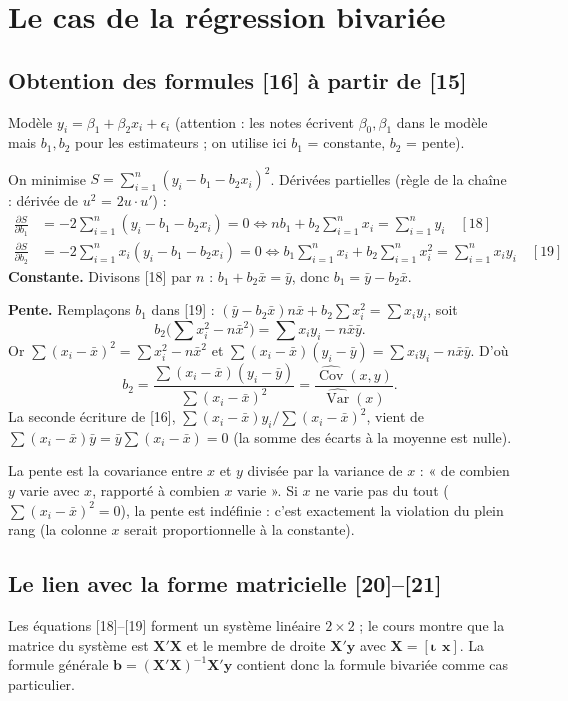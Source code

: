 \documentclass[11pt,a4paper]{article}
\newcommand{\vy}{\mathbf{y}}
\newcommand{\vX}{\mathbf{X}}
\newcommand{\vb}{\mathbf{b}}
\newcommand{\vx}{\mathbf{x}}
\newcommand{\vi}{\bm{\iota}}
\newcommand{\XtX}{\vX'\vX}
\newcommand{\XtXi}{(\vX'\vX)^{-1}}
\newcommand{\Var}{\operatorname{Var}}
\newcommand{\Cov}{\operatorname{Cov}}
\newcommand{\sumi}{\sum_{i=1}^{n}}
\begin{document}
\section{Le cas de la régression bivariée}

\subsection{Obtention des formules [16] à partir de [15]}
Modèle $y_i=\beta_1+\beta_2x_i+\epsilon_i$ (attention : les notes écrivent $\beta_0,\beta_1$ dans le modèle mais $b_1,b_2$ pour les estimateurs ; on utilise ici $b_1$ = constante, $b_2$ = pente).

\begin{detail}
On minimise $S=\sumi(y_i-b_1-b_2x_i)^2$. Dérivées partielles (règle de la chaîne : dérivée de $u^2$ = $2u\cdot u'$) :
\begin{align*}
\frac{\partial S}{\partial b_1}&=-2\sumi(y_i-b_1-b_2x_i)=0 \iff nb_1+b_2\sumi x_i=\sumi y_i \quad [18]\\
\frac{\partial S}{\partial b_2}&=-2\sumi x_i(y_i-b_1-b_2x_i)=0 \iff b_1\sumi x_i+b_2\sumi x_i^2=\sumi x_iy_i \quad [19]
\end{align*}
\textbf{Constante.} Divisons [18] par $n$ : $b_1+b_2\bar x=\bar y$, donc $b_1=\bar y-b_2\bar x$.

\textbf{Pente.} Remplaçons $b_1$ dans [19] :
$(\bar y-b_2\bar x)n\bar x+b_2\sum x_i^2=\sum x_iy_i$, soit
\[
b_2\Big(\sum x_i^2-n\bar x^2\Big)=\sum x_iy_i-n\bar x\bar y .
\]
Or $\sum(x_i-\bar x)^2=\sum x_i^2-n\bar x^2$ et $\sum(x_i-\bar x)(y_i-\bar y)=\sum x_iy_i-n\bar x\bar y$. D'où
\[
b_2=\frac{\sum(x_i-\bar x)(y_i-\bar y)}{\sum(x_i-\bar x)^2}=\frac{\widehat{\Cov}(x,y)}{\widehat{\Var}(x)} .
\]
La seconde écriture de [16], $\sum(x_i-\bar x)y_i/\sum(x_i-\bar x)^2$, vient de $\sum(x_i-\bar x)\bar y=\bar y\sum(x_i-\bar x)=0$ (la somme des écarts à la moyenne est nulle).
\end{detail}

\begin{intuition}
La pente est la covariance entre $x$ et $y$ divisée par la variance de $x$ : « de combien $y$ varie avec $x$, rapporté à combien $x$ varie ». Si $x$ ne varie pas du tout ($\sum(x_i-\bar x)^2=0$), la pente est indéfinie : c'est exactement la violation du plein rang (la colonne $x$ serait proportionnelle à la constante).
\end{intuition}

\subsection{Le lien avec la forme matricielle [20]--[21]}
Les équations [18]--[19] forment un système linéaire $2\times2$ ; le cours montre que la matrice du système est $\XtX$ et le membre de droite $\vX'\vy$ avec $\vX=[\vi\ \ \vx]$. La formule générale $\vb=\XtXi\vX'\vy$ contient donc la formule bivariée comme cas particulier.
\end{document}
